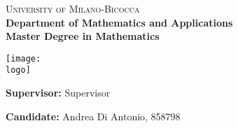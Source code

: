 \begin{titlepage}
    \thispagestyle{fancy}
    \fancyhf{}
	\fancyhead[C]{}

    \centering
    
    \begin{minipage}[t]{1\textwidth}
        \centering
        \huge{\textsc{University of Milano-Bicocca}} \\
        \large{\textbf{Department of Mathematics and Applications}} \\
        \large{\textbf{Master Degree in Mathematics}} \\
    \end{minipage}
    
    \vspace{10mm}
        
    \centering
    \begin{minipage}[t]{1\textwidth}
    \centering
    \texttt{[image: \\logo]}
    \end{minipage}
    
    \vspace{10mm}
    
    \begin{center}
        \huge{\textbf{\documenttitle}}
    \end{center}
    
    \vspace{10mm}

    \begin{flushleft}
        \noindent \large{\textbf{Supervisor:} Supervisor} \\
    \end{flushleft}
    
    \vspace{10mm}

    \begin{flushright}
        \large{ \textbf{Candidate:} Andrea Di Antonio, 858798}
    \end{flushright}
\end{titlepage}
